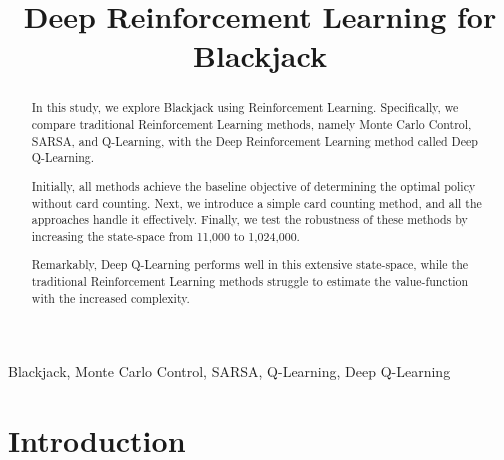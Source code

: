 \documentclass[conference]{IEEEtran}
\begin{document}
\title{Deep Reinforcement Learning for Blackjack}

\author{
}
\maketitle



\begin{abstract}
In this study, we explore Blackjack using Reinforcement Learning. Specifically, we compare traditional Reinforcement Learning methods, namely Monte Carlo Control, SARSA, and Q-Learning, with the Deep Reinforcement Learning method called Deep Q-Learning.

Initially, all methods achieve the baseline objective of determining the optimal policy without card counting. Next, we introduce a simple card counting method, and all the approaches handle it effectively. Finally, we test the robustness of these methods by increasing the state-space from 11,000 to 1,024,000.

Remarkably, Deep Q-Learning performs well in this extensive state-space, while the traditional Reinforcement Learning methods struggle to estimate the value-function with the increased complexity.
\end{abstract}

\begin{IEEEkeywords}
	Blackjack, Monte Carlo Control, SARSA, Q-Learning, Deep Q-Learning
\end{IEEEkeywords}

\section{Introduction}
\end{document}
